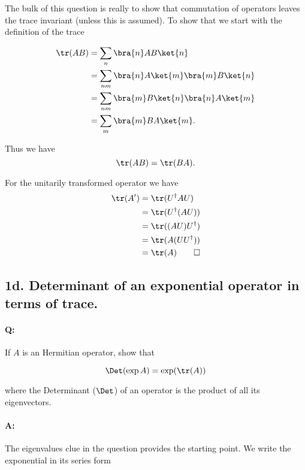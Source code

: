 The bulk of this question is really to show that commutation of operators leaves the trace invariant (unless this is assumed).  To show that we start with the definition of the trace

\begin{align*}
\tr(AB) 
&= \sum_n \bra{n} A B \ket{n} \\
&= \sum_{n m} \bra{n} A \ket{m} \bra{m} B \ket{n} \\
&= \sum_{n m} 
\bra{m} B \ket{n} 
\bra{n} A \ket{m} 
\\
&= \sum_{m} \bra{m} B A \ket{m}.
\end{align*}

Thus we have
\begin{equation}\label{eqn:qmIexamPractice2008Dec:1b:10}
\tr(A B) = \tr( B A ).
\end{equation}

For the unitarily transformed operator we have
\begin{align*}
\tr(A') 
&= \tr( U^\dagger A U ) \\
&= \tr( U^\dagger (A U) ) \\
&= \tr( (A U) U^\dagger ) \\
&= \tr( A (U U^\dagger) ) \\
&= \tr( A ) \qquad \square
\end{align*}

\subsection{1d.  Determinant of an exponential operator in terms of trace.}

\paragraph{Q:} If $A$ is an Hermitian operator, show that

\begin{equation}\label{eqn:qmIexamPractice2008Dec:1d:10}
\Det( \exp A ) = \exp ( \tr(A) )
\end{equation}

where the Determinant ($\Det$) of an operator is the product of all its eigenvectors.

\paragraph{A:}

The eigenvalues clue in the question provides the starting point.  We write the exponential in its series form


